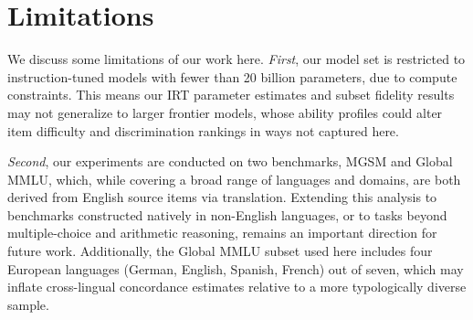 \documentclass[11pt]{article}
\begin{document}

\section*{Limitations}
\label{sec:lim}

We discuss some limitations of our work here. \textit{First}, our model set is restricted to instruction-tuned models with fewer than 20 billion parameters, due to compute constraints. This means our IRT parameter estimates and subset fidelity results may not generalize to larger frontier models, whose ability profiles could alter item difficulty and discrimination rankings in ways not captured here.

\textit{Second}, our experiments are conducted on two benchmarks, MGSM and Global MMLU, which, while covering a broad range of languages and domains, are both derived from English source items via translation. Extending this analysis to benchmarks constructed natively in non-English languages, or to tasks beyond multiple-choice and arithmetic reasoning, remains an important direction for future work. Additionally, the Global MMLU subset used here includes four European languages (German, English, Spanish, French) out of seven, which may inflate cross-lingual concordance estimates relative to a more typologically diverse sample.
\end{document}
